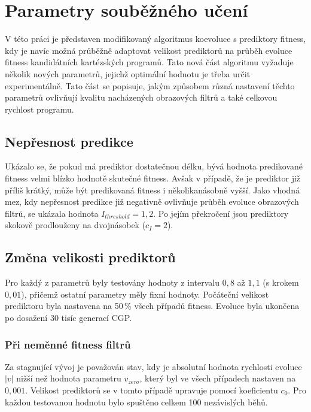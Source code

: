 \section{Parametry souběžného učení}

V této práci je představen modifikovaný algoritmus koevoluce s prediktory fitness, kdy je navíc možná průběžně adaptovat velikost prediktorů na průběh evoluce fitness kandidátních kartézských programů. Tato nová část algoritmu vyžaduje několik nových parametrů, jejichž optimální hodnotu je třeba určit experimentálně. Tato část se popisuje, jakým způsobem různá nastavení těchto parametrů ovlivňují kvalitu nacházených obrazových filtrů a také celkovou rychlost programu.

\subsection{Nepřesnost predikce}

Ukázalo se, že pokud má prediktor dostatečnou délku, bývá hodnota predikované fitness velmi blízko hodnotě skutečné fitness. Avšak v případě, že je prediktor již příliš krátký, může být predikovaná fitness i několikanásobně vyšší. Jako vhodná mez, kdy nepřesnost predikce již negativně ovlivňuje průběh evoluce obrazových filtrů, se ukázala hodnota $I_\mathit{threshold} = 1,2$. Po jejím překročení jsou prediktory skokově prodlouženy na dvojnásobek ($c_I = 2$).

\subsection{Změna velikosti prediktorů}

Pro každý z parametrů byly testovány hodnoty z intervalu $0,8$ až $1,1$ (s krokem $0,01$), přičemž ostatní parametry měly fixní hodnoty. Počáteční velikost prediktoru byla nastavena na 50\,\% všech případů fitness. Evoluce byla ukončena po dosažení 30 tisíc generací CGP.

\subsubsection*{Při neměnné fitness filtrů}

Za stagnující vývoj je považován stav, kdy je absolutní hodnota rychlosti evoluce $|v|$ nižší než hodnota parametru $v_\mathit{zero}$, který byl ve všech případech nastaven na $0,001$. Velikost prediktorů se v tomto případě upravuje pomocí koeficientu $c_0$. Pro každou testovanou hodnotu bylo spuštěno celkem 100 nezávislých běhů.

